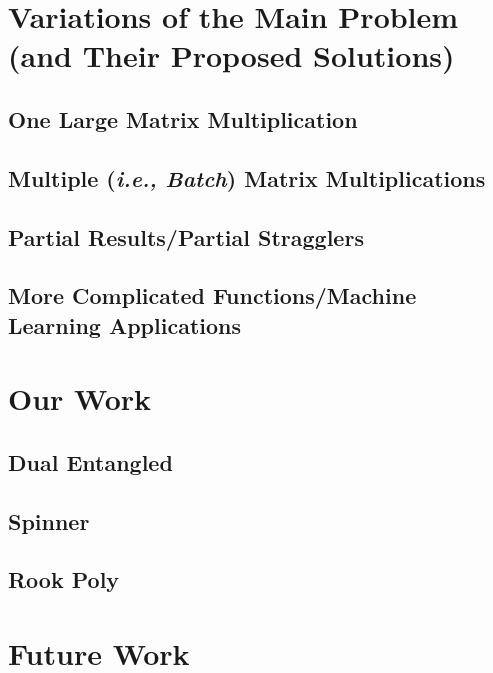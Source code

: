 \documentclass{report}
\begin{document}
\chapter{Variations of the Main Problem ({and Their Proposed Solutions})}

\section{One Large Matrix Multiplication}

\section{Multiple (\emph{i.e., Batch}) Matrix Multiplications}

\section{Partial Results/Partial Stragglers}

\section{More Complicated Functions/Machine Learning Applications}





\chapter{Our Work}

\section{Dual Entangled}

\section{Spinner}

\section{Rook Poly}

\chapter{Future Work}



\end{document}
